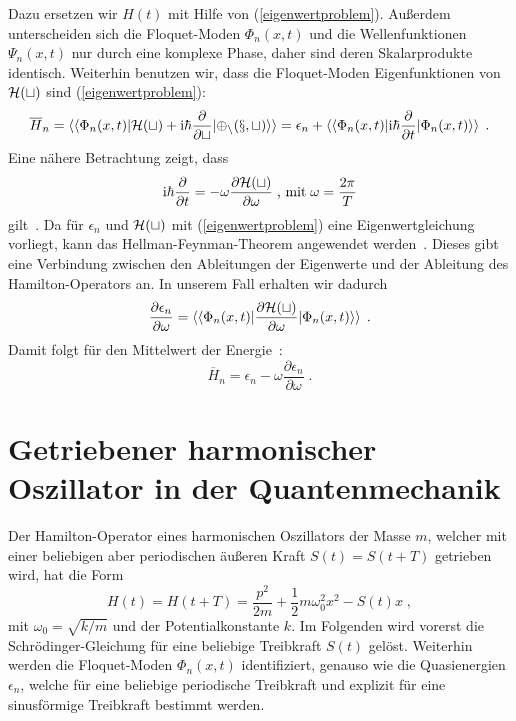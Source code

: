    Dazu ersetzen wir $H(t)$ mit Hilfe von (\ref{eigenwertproblem}).
    Außerdem unterscheiden sich die Floquet-Moden $\Phi_n(x,t)$ und die Wellenfunktionen $\Psi_n(x,t)$ nur durch eine komplexe Phase, daher sind deren Skalarprodukte identisch.
    Weiterhin benutzen wir, dass die Floquet-Moden Eigenfunktionen von $\cal{H}(t)$ sind (\ref{eigenwertproblem}):
    \begin{align}
      \begin{split}
      \overline H_n  = \braket{\braket{\Phi_n(x,t)|\cal{H}(t)+\text{i}\hbar\frac{\partial}{\partial t}|\Phi_n(x,t)}}
      = \epsilon_n + \braket{\braket{\Phi_n(x,t)|\text{i}\hbar\frac{\partial}{\partial t}|\Phi_n(x,t)}} \; .
    \end{split}
    \end{align}
    Eine nähere Betrachtung zeigt, dass
    \begin{equation}
      \text{i}\hbar\frac{\partial}{\partial t} = -\omega \frac{\partial \cal{H}(t)}{\partial \omega} \;\text{, mit}\; \omega=\frac{2\pi}{T}
    \end{equation}
    gilt~\cite{haengi}.
    Da für $\epsilon_n$ und $\cal H(t)$ mit (\ref{eigenwertproblem}) eine Eigenwertgleichung vorliegt, kann das Hellman-Feynman-Theorem angewendet werden~\cite{hellmann}.
    Dieses gibt eine Verbindung zwischen den Ableitungen der Eigenwerte und der Ableitung des Hamilton-Operators an.
    In unserem Fall erhalten wir dadurch
    \begin{equation}
      \frac{\partial \epsilon_n}{\partial \omega} = \braket{\braket{\Phi_n(x,t)|\frac{\partial \cal H(t)}{\partial \omega}|\Phi_n(x,t)}} \; .
    \end{equation}
    Damit folgt für den Mittelwert der Energie~\cite{haengi}:
    \begin{equation}
      \overline H_n = \epsilon_n - \omega\frac{\partial \epsilon_n}{\partial \omega} \; .
      \label{mittleres_H}
    \end{equation}

\iffalse
    \chapter{Getriebener harmonischer Oszillator in der Quantenmechanik}
      Der Hamilton-Operator eines harmonischen Oszillators der Masse $m$, welcher mit einer beliebigen aber periodischen äußeren Kraft $S(t)=S(t+T)$ getrieben wird, hat die Form
      \begin{equation}
        H(t) = H(t+T) = \frac{p^2}{2m} + \frac{1}{2}m\omega_0^2x^2-S(t)x \; ,
        \label{H_einzelner}
      \end{equation}
      mit $\omega_0=\sqrt{k/m}$ und der Potentialkonstante $k$.
      Im Folgenden wird vorerst die Schrödinger-Gleichung für eine beliebige Treibkraft $S(t)$ gelöst.
      Weiterhin werden die Floquet-Moden $\Phi_n(x,t)$ identifiziert, genauso wie die Quasienergien $\epsilon_n$, welche für eine beliebige periodische Treibkraft und explizit für eine sinusförmige Treibkraft bestimmt werden.

